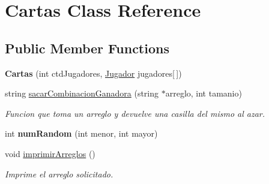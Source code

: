 \hypertarget{class_cartas}{}\section{Cartas Class Reference}
\label{class_cartas}
\subsection*{Public Member Functions}
\begin{DoxyCompactItemize}
\item 
\mbox{\label{class_cartas_aa80fa7b73e5d7280e4063b914c1a6b4c}} 
{\bfseries Cartas} (int ctd\+Jugadores, \hyperlink{class_jugador}{Jugador} jugadores\mbox{[}$\,$\mbox{]})
\item 
string \hyperlink{class_cartas_a167c673371f5c944b845c5cf01990a59}{sacar\+Combinacion\+Ganadora} (string $\ast$arreglo, int tamanio)
\begin{DoxyCompactList}\small\item\em Funcion que toma un arreglo y devuelve una casilla del mismo al azar. \end{DoxyCompactList}\item 
\mbox{\label{class_cartas_a134117830ee18f7ecd469982c90b229c}} 
int {\bfseries num\+Random} (int menor, int mayor)
\item 
\mbox{\label{class_cartas_a8fe59082f2c8c0707da14c7822a904ae}} 
void \hyperlink{class_cartas_a8fe59082f2c8c0707da14c7822a904ae}{imprimir\+Arreglos} ()
\begin{DoxyCompactList}\small\item\em Imprime el arreglo solicitado. \end{DoxyCompactList}\end{DoxyCompactItemize}
